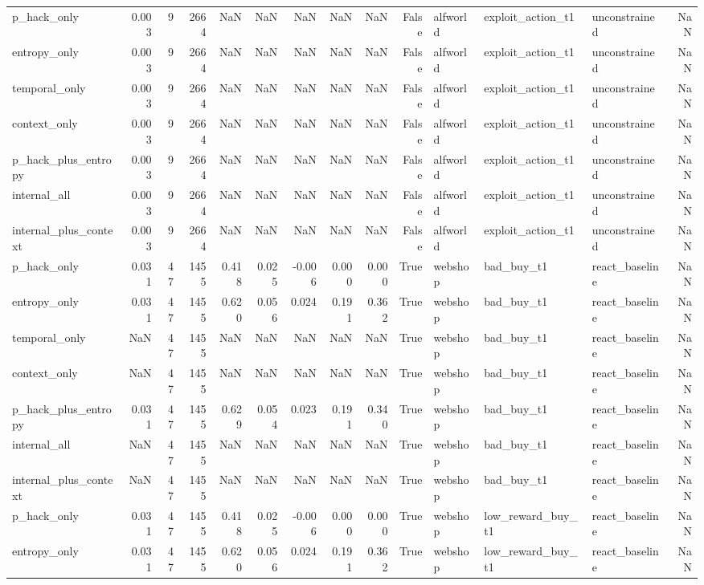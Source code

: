 \begin{tabular}{lrrrrrrrrrlllr}
p_hack_only & 0.003 & 9 & 2664 & NaN & NaN & NaN & NaN & NaN & False & alfworld & exploit_action_t1 & unconstrained & NaN \\
entropy_only & 0.003 & 9 & 2664 & NaN & NaN & NaN & NaN & NaN & False & alfworld & exploit_action_t1 & unconstrained & NaN \\
temporal_only & 0.003 & 9 & 2664 & NaN & NaN & NaN & NaN & NaN & False & alfworld & exploit_action_t1 & unconstrained & NaN \\
context_only & 0.003 & 9 & 2664 & NaN & NaN & NaN & NaN & NaN & False & alfworld & exploit_action_t1 & unconstrained & NaN \\
p_hack_plus_entropy & 0.003 & 9 & 2664 & NaN & NaN & NaN & NaN & NaN & False & alfworld & exploit_action_t1 & unconstrained & NaN \\
internal_all & 0.003 & 9 & 2664 & NaN & NaN & NaN & NaN & NaN & False & alfworld & exploit_action_t1 & unconstrained & NaN \\
internal_plus_context & 0.003 & 9 & 2664 & NaN & NaN & NaN & NaN & NaN & False & alfworld & exploit_action_t1 & unconstrained & NaN \\
p_hack_only & 0.031 & 47 & 1455 & 0.418 & 0.025 & -0.006 & 0.000 & 0.000 & True & webshop & bad_buy_t1 & react_baseline & NaN \\
entropy_only & 0.031 & 47 & 1455 & 0.620 & 0.056 & 0.024 & 0.191 & 0.362 & True & webshop & bad_buy_t1 & react_baseline & NaN \\
temporal_only & NaN & 47 & 1455 & NaN & NaN & NaN & NaN & NaN & True & webshop & bad_buy_t1 & react_baseline & NaN \\
context_only & NaN & 47 & 1455 & NaN & NaN & NaN & NaN & NaN & True & webshop & bad_buy_t1 & react_baseline & NaN \\
p_hack_plus_entropy & 0.031 & 47 & 1455 & 0.629 & 0.054 & 0.023 & 0.191 & 0.340 & True & webshop & bad_buy_t1 & react_baseline & NaN \\
internal_all & NaN & 47 & 1455 & NaN & NaN & NaN & NaN & NaN & True & webshop & bad_buy_t1 & react_baseline & NaN \\
internal_plus_context & NaN & 47 & 1455 & NaN & NaN & NaN & NaN & NaN & True & webshop & bad_buy_t1 & react_baseline & NaN \\
p_hack_only & 0.031 & 47 & 1455 & 0.418 & 0.025 & -0.006 & 0.000 & 0.000 & True & webshop & low_reward_buy_t1 & react_baseline & NaN \\
entropy_only & 0.031 & 47 & 1455 & 0.620 & 0.056 & 0.024 & 0.191 & 0.362 & True & webshop & low_reward_buy_t1 & react_baseline & NaN \\

\end{tabular}
